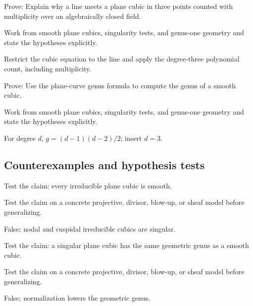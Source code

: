 \begin{exercise}\label{exr:vi43-expand-08}
Prove: Explain why a line meets a plane cubic in three points counted with multiplicity over an algebraically closed field.
\end{exercise}
\begin{hint}
Work from smooth plane cubics, singularity tests, and genus-one geometry and state the hypotheses explicitly.
\end{hint}
\begin{solution}
Restrict the cubic equation to the line and apply the degree-three polynomial count, including multiplicity.
\end{solution}

\begin{exercise}\label{exr:vi43-expand-09}
Prove: Use the plane-curve genus formula to compute the genus of a smooth cubic.
\end{exercise}
\begin{hint}
Work from smooth plane cubics, singularity tests, and genus-one geometry and state the hypotheses explicitly.
\end{hint}
\begin{solution}
For degree $d$, $g=(d-1)(d-2)/2$; insert $d=3$.
\end{solution}

\subsection*{Counterexamples and hypothesis tests}

\begin{exercise}\label{exr:vi43-expand-10}
Test the claim: every irreducible plane cubic is smooth.
\end{exercise}
\begin{hint}
Test the claim on a concrete projective, divisor, blow-up, or sheaf model before generalizing.
\end{hint}
\begin{solution}
False; nodal and cuspidal irreducible cubics are singular.
\end{solution}

\begin{exercise}\label{exr:vi43-expand-11}
Test the claim: a singular plane cubic has the same geometric genus as a smooth cubic.
\end{exercise}
\begin{hint}
Test the claim on a concrete projective, divisor, blow-up, or sheaf model before generalizing.
\end{hint}
\begin{solution}
False; normalization lowers the geometric genus.
\end{solution}

